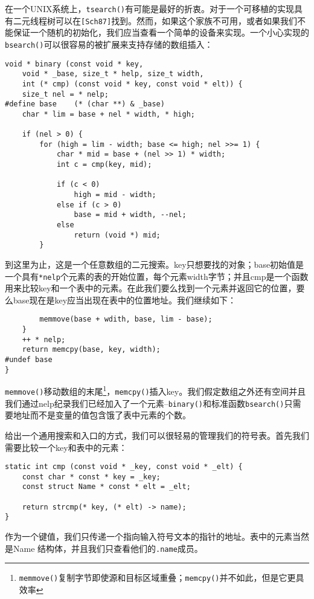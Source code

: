 在一个UNIX系统上，\verb|tsearch()|有可能是最好的折衷。对于一个可移植的实现具有二元线程树可以在\verb|[Sch87]|找到。然而，如果这个家族不可用，或者如果我们不能保证一个随机的初始化，我们应当查看一个简单的设备来实现。一个小心实现的\verb|bsearch()|可以很容易的被扩展来支持存储的数组插入：

\begin{lstlisting}
void * binary (const void * key,
	void * _base, size_t * help, size_t width,
	int (* cmp) (const void * key, const void * elt)) {
	size_t nel = * nelp;
#define base	(* (char **) & _base)
	char * lim = base + nel * width, * high;

	if (nel > 0) {
		for (high = lim - width; base <= high; nel >>= 1) {
			char * mid = base + (nel >> 1) * width;
			int c = cmp(key, mid);

			if (c < 0)
				high = mid - width;
			else if (c > 0)
				base = mid + width, --nel;
			else
				return (void *) mid;
		}
\end{lstlisting}

到这里为止，这是一个任意数组的二元搜索。key只想要找的对象；base初始值是一个具有\verb|*nelp|个元素的表的开始位置，每个元素width字节；并且cmp是一个函数用来比较key和一个表中的元素。在此我们要么找到一个元素并返回它的位置，要么base现在是key应当出现在表中的位置地址。我们继续如下：

\begin{lstlisting}
		memmove(base + wdith, base, lim - base);
	}
	++ * nelp;
	return memcpy(base, key, width);
#undef base
}
\end{lstlisting}

\verb|memmove()|移动数组的末尾\footnote{\verb|memmove()|复制字节即使源和目标区域重叠；\verb|memcpy()|并不如此，但是它更具效率}，\verb|memcpy()|插入key。我们假定数组之外还有空间并且我们通过nelp纪录我们已经加入了一个元素--\verb|binary()|和标准函数\verb|bsearch()|只需要地址而不是变量的值包含饿了表中元素的个数。

给出一个通用搜索和入口的方式，我们可以很轻易的管理我们的符号表。首先我们需要比较一个key和表中的元素：

\begin{lstlisting}
static int cmp (const void * _key, const void * _elt) {
	const char * const * key = _key;
	const struct Name * const * elt = _elt;

	return strcmp(* key, (* elt) -> name);
}
\end{lstlisting}

作为一个键值，我们只传递一个指向输入符号文本的指针的地址。表中的元素当然是Name 结构体，并且我们只查看他们的\verb|.name|成员。

